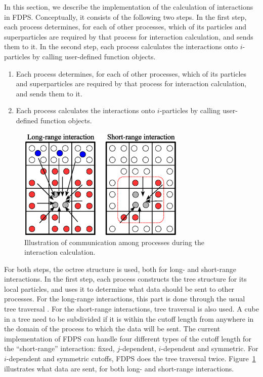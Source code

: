 In this section, we describe the implementation of the calculation of
interactions in FDPS. Conceptually, it consists of the following two
steps. In the first step, each process determines, for each of other
processes, which of its particles and superparticles are required by
that process for interaction calculation, and sends them to it. In the
second step, each process calculates the interactions onto
$i$-particles by calling user-defined function objects.

\begin{enumerate}
\item Each process determines, for each of other processes, which of
  its particles and   superparticles are required by that process for
  interaction calculation,   and sends them to it.

\item Each process calculates the interactions onto  $i$-particles by
  calling user-defined function objects.
\end{enumerate}
\fi

\begin{figure}
  \begin{center}
    \includegraphics[width=8cm]{fig/exchangeLET.eps}
  \end{center}
  \caption{Illustration of communication among processes during the
    interaction calculation.}
  \label{fig:exchangeLET}
\end{figure}

For both steps, the octree structure is used, both for long- and
short-range interactions.
In the first step, each process constructs the tree structure for its
local particles, and uses it to determine what data should be sent to
other processes. For the long-range interactions, this part is done
through the usual tree traversal \cite{1986Natur.324..446B,
  1990JCoPh..87..161B}. For the short-range interactions, tree
traversal is also used. A cube in a tree need to be subdivided if it
is within the cutoff length from anywhere in the domain of the process
to which the data will be sent.  The current implementation of FDPS
can handle four different types of the cutoff length for the
``short-range'' interaction: fixed, $j$-dependent, $i$-dependent and
symmetric.  For $i$-dependent and symmetric cutoffs, FDPS does the
tree traversal twice.  Figure~\ref{fig:exchangeLET} illustrates what
data are sent, for both long- and short-range interactions.

